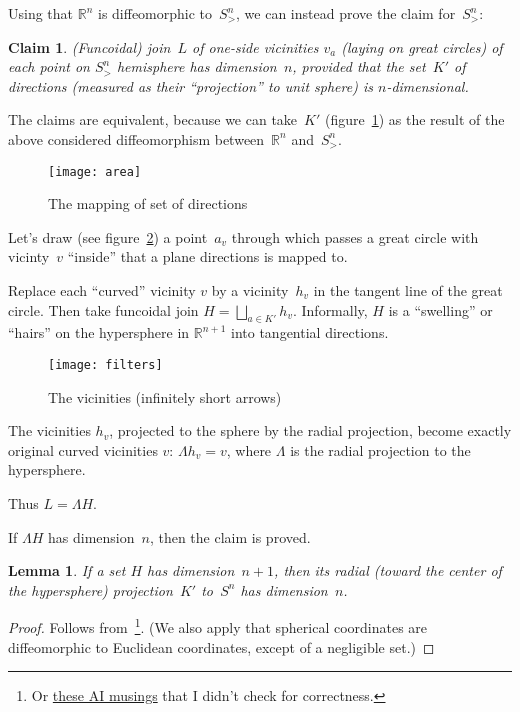 \documentclass[oneside,draft]{amsart}
\newtheorem{lem}{Lemma}
\newtheorem{claim}{Claim}
\begin{document}
Using that $\mathbb{R}^n$ is diffeomorphic to~$S^n_{>}$, we can instead prove the claim for~$S^n_{>}$:

\begin{claim}
(Funcoidal) join~$L$ of one-si\-de vicinities $v_a$ (laying on great circles) of each point on $S^n_{>}$ hemisphere has dimension~$n$, provided that the set~$K'$ of directions (measured as their ``projection'' to unit sphere) is $n$-di\-men\-sio\-nal.
\end{claim}

The claims are equivalent, because we can take~$K'$ (figure~\ref{fig:area}) as the result of the above considered diffeomorphism between~$\mathbb{R}^n$ and~$S^n_{>}$.

\begin{figure}[hbt]
    \centering
    \texttt{[image: area]}
    \caption{The mapping of set of directions}
    \label{fig:area}
\end{figure}

Let's draw (see figure~\ref{fig:filters}) a point~$a_v$ through which passes a great circle with vicinty~$v$ ``inside'' that a plane directions is mapped to.

Replace each ``curved'' vicinity $v$ by a vicinity~$h_v$ in the tangent line of the great circle. Then take funcoidal join $H=\bigsqcup_{a\in K'}h_v$. Informally, $H$ is a ``swelling'' or ``hairs'' on the hypersphere in $\mathbb{R}^{n+1}$ into tangential directions.

\begin{figure}[hbt]
    \centering
    \texttt{[image: filters]}
    \caption{The vicinities (infinitely short arrows)}
    \label{fig:filters}
\end{figure}

The vicinities $h_v$, projected to the sphere by the radial projection, become exactly original curved vicinities $v$: $\Lambda h_v=v$, where $\Lambda$ is the radial projection to the hypersphere.

Thus $L = \Lambda H$.

If $\Lambda H$ has dimension~$n$, then the claim is proved.

\begin{lem}
If a set $H$ has dimension~$n+1$, then its radial (toward the center of the hypersphere) projection~$K'$ to~$S^n$ has dimension~$n$.
\end{lem}

\begin{proof}
Follows from~\cite{189275}\footnote{Or \href{https://grok.com/share/bGVnYWN5_2e0aef8b-4309-420f-815c-a09d76ae97c1}{these AI musings}
that I didn't check for correctness.}.
(We also apply that spherical coordinates are diffeomorphic to Euclidean coordinates, except of a negligible set.)
\end{proof}
\end{document}
